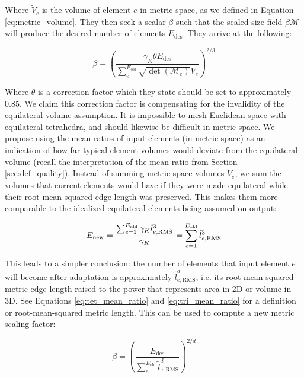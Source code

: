 Where $\tilde{V}_e$ is the volume of element $e$ in metric space,
as we defined in Equation \ref{eq:metric_volume}.
They then seek a scalar $\beta$ such that the scaled size field
$\beta\mathcal{M}$ will produce the desired number of elements
$E_\text{des}$.
They arrive at the following:

\begin{equation}
\beta = \left(\frac{\gamma_K\theta E_{\text{des}}}
{\sum_e^{E_{\text{old}}} \sqrt{\det(\mathcal{M}_e)}V_e}\right)^{2/3}
\end{equation}

Where $\theta$ is a correction factor which they state should
be set to approximately $0.85$.
We claim this correction factor is compensating for the invalidity
of the equilateral-volume assumption.
It is impossible to mesh Euclidean space with equilateral tetrahedra,
and should likewise be difficult in metric space.
We propose using the mean ratios of input elements (in metric space)
as an indication of how far typical element volumes would deviate
from the equilateral volume (recall the interpretation of the
mean ratio from Section \ref{sec:def_quality}).
Instead of summing metric space volumes $\tilde{V}_e$, we sum
the volumes that current elements would have if they were
made equilateral while their root-mean-squared edge length was preserved.
This makes them more comparable to the idealized equilateral
elements being assumed on output:

\begin{equation}
E_{\text{new}} = \frac{\sum_{e=1}^{E_{\text{old}}}
\gamma_K \tilde{l}_{e,\text{RMS}}^3}{\gamma_K}
 = \sum_{e=1}^{E_{\text{old}}} \tilde{l}_{e,\text{RMS}}^3 \\
\end{equation}

This leads to a simpler conclusion: the number of elements that
input element $e$ will become after adaptation is approximately
$\tilde{l}_{e,\text{RMS}}^d$, i.e. its root-mean-squared metric edge length
raised to the power that represents area in 2D or volume in 3D.
See Equations \ref{eq:tet_mean_ratio} and \ref{eq:tri_mean_ratio}
for a definition or root-mean-squared metric length.
This can be used to compute a new metric scaling factor:

\begin{equation} \label{eq:my_metric_scalar}
\beta = \left(\frac{E_{\text{des}}}
{\sum_e^{E_{\text{old}}} \tilde{l}_{e,\text{RMS}}^d}\right)^{2/d}
\end{equation}

